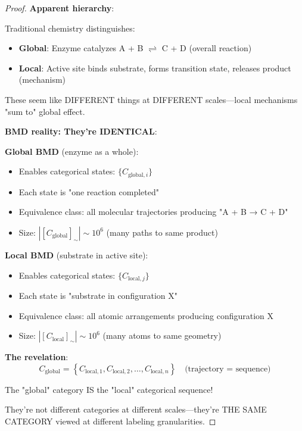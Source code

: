 \documentclass[12pt,a4paper]{article}
\begin{document}
\begin{proof}
\textbf{Apparent hierarchy}:

Traditional chemistry distinguishes:
\begin{itemize}
\item \textbf{Global}: Enzyme catalyzes A + B $\rightleftharpoons$ C + D (overall reaction)
\item \textbf{Local}: Active site binds substrate, forms transition state, releases product (mechanism)
\end{itemize}

These seem like DIFFERENT things at DIFFERENT scales—local mechanisms "sum to" global effect.

\textbf{BMD reality: They're IDENTICAL}:

\textbf{Global BMD} (enzyme as a whole):
\begin{itemize}
\item Enables categorical states: $\{C_{\text{global},i}\}$
\item Each state is "one reaction completed"
\item Equivalence class: all molecular trajectories producing "A + B → C + D"
\item Size: $|[C_{\text{global}}]_{\sim}| \sim 10^6$ (many paths to same product)
\end{itemize}

\textbf{Local BMD} (substrate in active site):
\begin{itemize}
\item Enables categorical states: $\{C_{\text{local},j}\}$
\item Each state is "substrate in configuration X"
\item Equivalence class: all atomic arrangements producing configuration X
\item Size: $|[C_{\text{local}}]_{\sim}| \sim 10^6$ (many atoms to same geometry)
\end{itemize}

\textbf{The revelation}:
\begin{equation}
\boxed{C_{\text{global}} = \left\{C_{\text{local},1}, C_{\text{local},2}, \ldots, C_{\text{local},n}\right\} \quad \text{(trajectory = sequence)}}
\end{equation}

The "global" category IS the "local" categorical sequence!

They're not different categories at different scales—they're THE SAME CATEGORY viewed at different labeling granularities.


\end{proof}
\end{document}
